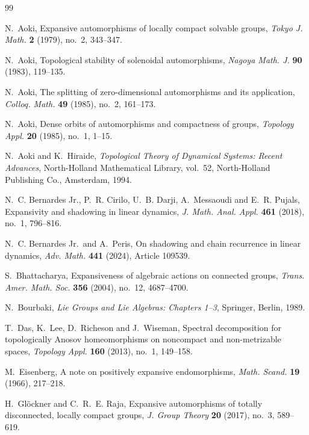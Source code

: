\documentclass[12pt]{amsart}
\theoremstyle{definition}
\numberwithin{equation}{section}
\theoremstyle{remark}
\begin{document}
\begin{thebibliography}{99}


N.~Aoki,
Expansive automorphisms of locally compact solvable groups,
\emph{Tokyo J. Math.} \textbf{2} (1979), no.~2, 343--347.

N.~Aoki,
Topological stability of solenoidal automorphisms,
\emph{Nagoya Math. J.} \textbf{90} (1983), 119--135.

N.~Aoki,
The splitting of zero-dimensional automorphisms and its application,
\emph{Colloq. Math.} \textbf{49} (1985), no.~2, 161--173.

N.~Aoki,
Dense orbits of automorphisms and compactness of groups,
\emph{Topology Appl.} \textbf{20} (1985), no.~1, 1--15.

N.~Aoki and K.~Hiraide,
\emph{Topological Theory of Dynamical Systems: Recent Advances},
North-Holland Mathematical Library, vol.~52,
North-Holland Publishing Co., Amsterdam, 1994.

N.~C. Bernardes Jr., P.~R. Cirilo, U.~B. Darji, A.~Messaoudi and
E.~R. Pujals,
Expansivity and shadowing in linear dynamics,
\emph{J. Math. Anal. Appl.} \textbf{461} (2018), no.~1, 796--816.

N.~C. Bernardes Jr.\ and A.~Peris,
On shadowing and chain recurrence in linear dynamics,
\emph{Adv. Math.} \textbf{441} (2024), Article 109539.

S.~Bhattacharya,
Expansiveness of algebraic actions on connected groups,
\emph{Trans. Amer. Math. Soc.} \textbf{356} (2004), no.~12,
4687--4700.

N.~Bourbaki,
\emph{Lie Groups and Lie Algebras: Chapters 1--3},
Springer, Berlin, 1989.

T.~Das, K.~Lee, D.~Richeson and J.~Wiseman,
Spectral decomposition for topologically Anosov homeomorphisms on
noncompact and non-metrizable spaces,
\emph{Topology Appl.} \textbf{160} (2013), no.~1, 149--158.

M.~Eisenberg,
A note on positively expansive endomorphisms,
\emph{Math. Scand.} \textbf{19} (1966), 217--218.

H.~Gl\"ockner and C.~R.~E. Raja,
Expansive automorphisms of totally disconnected, locally compact groups,
\emph{J. Group Theory} \textbf{20} (2017), no.~3, 589--619.


\end{thebibliography}
\end{document}
